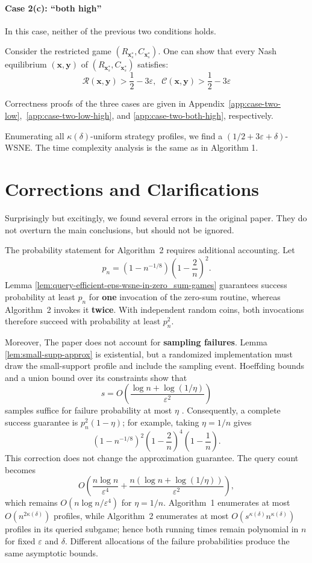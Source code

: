 \paragraph{Case 2(c): ``both high''}
In this case, neither of the previous two conditions holds.

Consider the restricted game $(R_{\mathbf{x}_s^*}, C_{\mathbf{x}_s^*})$. One can show that every Nash equilibrium $(\mathbf{x}, \mathbf{y})$ of $(R_{\mathbf{x}_s^*}, C_{\mathbf{x}_s^*})$ satisfies:
\[
  \mathcal{R}(\mathbf{x}, \mathbf{y}) > \frac12 - 3\varepsilon,\;\; \mathcal{C}(\mathbf{x}, \mathbf{y}) > \frac12 - 3\varepsilon
\]

Correctness proofs of the three cases are given in Appendix~\ref{app:case-two-low},~\ref{app:case-two-low-high}, and \ref{app:case-two-both-high}, respectively.

Enumerating all $\kappa(\delta)$-uniform strategy profiles, we find a $(1/2+3\varepsilon+\delta)$-WSNE. The time complexity analysis is the same as in Algorithm 1.

\section{Corrections and Clarifications}
\label{sec:source-corrections}

Surprisingly but excitingly, we found several errors in the original paper. They do not overturn the main conclusions, but should not be ignored.

The probability statement for Algorithm~2 requires additional accounting. Let
\[
  p_n=\left(1-n^{-1/8}\right)\left(1-\frac{2}{n}\right)^2.
\]
Lemma \ref{lem:query-efficient-eps-wsne-in-zero_sum-games} guarantees success probability at least $p_n$ for \textbf{one} invocation of the zero-sum routine, whereas Algorithm~2 invokes it \textbf{twice}. With independent random coins, both invocations therefore succeed with probability at least $p_n^2$.

Moreover, The paper does not account for \textbf{sampling failures}. Lemma \ref{lem:small-supp-approx} is existential, but a randomized implementation must draw the small-support profile and include the sampling event. Hoeffding bounds and a union bound over its constraints show that
\[
  s=O\!\left(\frac{\log n+\log(1/\eta)}{\varepsilon^2}\right)
\]
samples suffice for failure probability at most $\eta$ \cite{hoeffding63}. Consequently, a complete success guarantee is $p_n^2(1-\eta)$; for example, taking $\eta=1/n$ gives
\[
  \left(1-n^{-1/8}\right)^2
  \left(1-\frac{2}{n}\right)^4
  \left(1-\frac1n\right).
\]
This correction does not change the approximation guarantee. The query count becomes
\[
  O\!\left(
  \frac{n\log n}{\varepsilon^4}
  +\frac{n(\log n+\log(1/\eta))}{\varepsilon^2}
  \right),
\]
which remains $O(n\log n/\varepsilon^4)$ for $\eta=1/n$. Algorithm~1 enumerates at most $O(n^{2\kappa(\delta)})$ profiles, while Algorithm~2 enumerates at most $O(s^{\kappa(\delta)}n^{\kappa(\delta)})$ profiles in its queried subgame; hence both running times remain polynomial in $n$ for fixed $\varepsilon$ and $\delta$. Different allocations of the failure probabilities produce the same asymptotic bounds.

